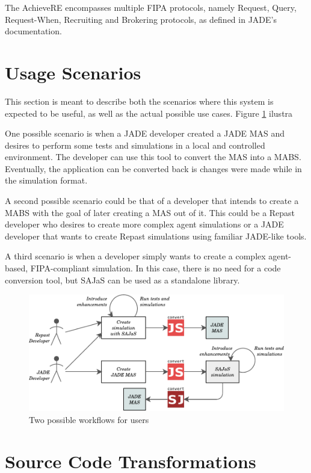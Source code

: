 The AchieveRE encompasses multiple \gls{FIPA} protocols, namely Request, Query, Request-When, Recruiting and Brokering protocols, as defined in JADE's documentation.

\section{Usage Scenarios}
\label{sec:solution-scenarios}
This section is meant to describe both the scenarios where this system is expected to be useful, as well as the actual possible use cases. Figure \ref{fig:prototypeFlow} ilustra

One possible scenario is when a JADE developer created a JADE MAS and desires to perform some tests and simulations in a local and controlled environment. The developer can use this tool to convert the MAS into a MABS. Eventually, the application can be converted back is changes were made while in the simulation format.

A second possible scenario could be that of a developer that intends to create a MABS with the goal of later creating a MAS out of it. This could be a Repast developer who desires to create more complex agent simulations or a JADE developer that wants to create Repast simulations using familiar JADE-like tools.

A third scenario is when a developer simply wants to create a complex agent-based, FIPA-compliant simulation. In this case, there is no need for a code conversion tool, but SAJaS can be used as a standalone library.

\begin{figure}[h]
	\centering
	\includegraphics[width=0.9\linewidth]{figures/prototypeFlow.pdf}
	\caption{
		Two possible workflows for \apiname{} users
	}
	\label{fig:prototypeFlow}
\end{figure}

\section{Source Code Transformations}
\label{sec:solution-codeGeneration}

